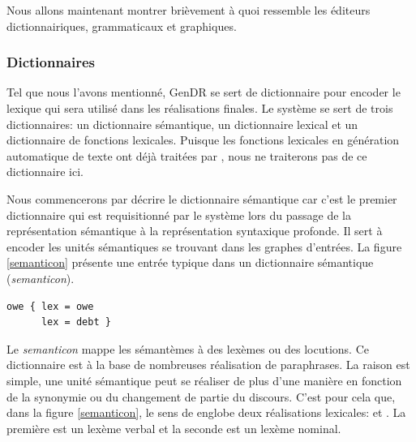 Nous allons maintenant montrer brièvement à quoi ressemble les éditeurs dictionnairiques, grammaticaux et graphiques.

\subsubsection{Dictionnaires}\label{dictio}

Tel que nous l'avons mentionné, GenDR se sert de dictionnaire pour encoder le lexique qui sera utilisé dans les réalisations finales. Le système se sert de trois dictionnaires: un dictionnaire sémantique, un dictionnaire lexical et un dictionnaire de fonctions lexicales. Puisque les fonctions lexicales en génération automatique de texte ont déjà traitées par \cite{LambreyImplementationcollocationspour2017}, nous ne traiterons pas de ce dictionnaire ici. 

Nous commencerons par décrire le dictionnaire sémantique car c'est le premier dictionnaire qui est requisitionné par le système lors du passage de la représentation sémantique à la représentation syntaxique profonde. Il sert à encoder les unités sémantiques se trouvant dans les graphes d'entrées. La figure \ref{semanticon} présente une entrée typique dans un dictionnaire sémantique (\emph{semanticon}).

\begin{lstlisting}[language=Xml, caption=Semanticon, label=semanticon]
owe { lex = owe
      lex = debt }
\end{lstlisting}

Le \emph{semanticon} mappe les sémantèmes à des lexèmes ou des locutions. Ce dictionnaire est à la base de nombreuses réalisation de paraphrases. La raison est simple, une unité sémantique peut se réaliser de plus d'une manière en fonction de la synonymie ou du changement de partie du discours. C'est pour cela que, dans la figure \ref{semanticon}, le sens de  englobe deux réalisations lexicales:  et . La première est un lexème verbal et la seconde est un lexème nominal.

